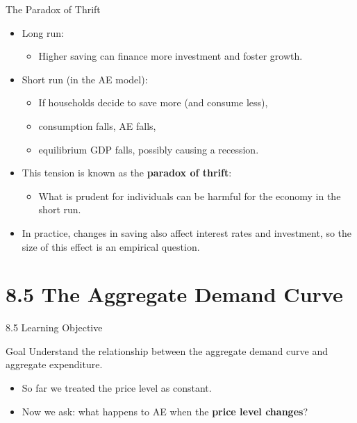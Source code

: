 \documentclass[aspectratio=169]{beamer}
\begin{document}
\begin{frame}{The Paradox of Thrift}
\transfade
\begin{itemize}[<+->]
  \item Long run:
  \begin{itemize}[<+->]
    \item Higher saving can finance more investment and foster growth.
  \end{itemize}
  \item Short run (in the AE model):
  \begin{itemize}[<+->]
    \item If households decide to save more (and consume less),
    \item consumption falls, AE falls,
    \item equilibrium GDP falls, possibly causing a recession.
  \end{itemize}
  \item This tension is known as the \textbf{paradox of thrift}:
  \begin{itemize}[<+->]
    \item What is prudent for individuals can be harmful for the economy in the short run.
  \end{itemize}
  \item In practice, changes in saving also affect interest rates and investment, so the size of this effect is an empirical question.
\end{itemize}
\end{frame}

\section{8.5 The Aggregate Demand Curve}

\begin{frame}{8.5 Learning Objective}
\transfade
\begin{block}{Goal}
Understand the relationship between the aggregate demand curve and aggregate expenditure.
\end{block}
\begin{itemize}[<+->]
  \item So far we treated the price level as constant.
  \item Now we ask: what happens to AE when the \textbf{price level changes}?
\end{itemize}
\end{frame}
\end{document}
